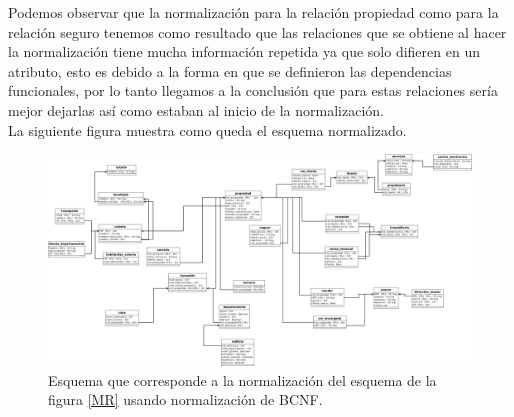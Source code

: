 \documentclass[10pt]{article}
\begin{document}
Podemos observar que la normalización para la relación propiedad como para la relación seguro tenemos como resultado que las relaciones que se obtiene al hacer la normalización tiene mucha información repetida ya que solo difieren en un atributo, esto es debido a la forma en que se definieron las dependencias funcionales, por lo tanto llegamos a la conclusión que para estas relaciones sería mejor dejarlas así como estaban al inicio de la normalización.\\

La siguiente figura muestra como queda el esquema normalizado.\\
    
    \begin{center}
    	\begin{figure}[H]
    		\centering
    		\includegraphics[width=1 \textwidth]{./modeloNormalizadoF.jpeg}
    		\caption{Esquema que corresponde a la normalización del esquema de la figura \ref{MR} usando normalización de BCNF.}
    	\end{figure}
    \end{center}
    
\end{document}
